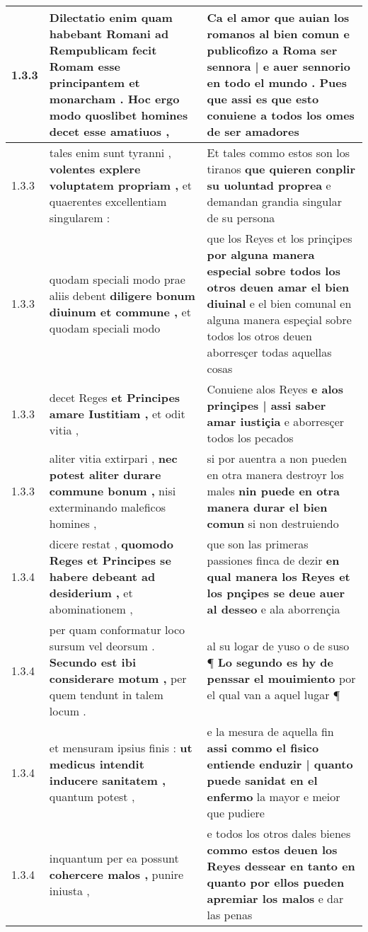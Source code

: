 \begin{tabular}{|p{1cm}|p{6.5cm}|p{6.5cm}|}
1.3.3 & Dilectatio enim quam habebant Romani \textbf{ ad Rempublicam fecit Romam esse principantem et monarcham . } Hoc ergo modo quoslibet homines decet esse amatiuos , & Ca el amor que auian los romanos al bien comun \textbf{ e publicofizo a Roma ser sennora | e auer sennorio en todo el mundo . } Pues que assi es que esto conuiene a todos los omes de ser amadores \\\hline
1.3.3 & tales enim sunt tyranni , \textbf{ volentes explere voluptatem propriam , } et quaerentes excellentiam singularem : & Et tales commo estos son los tiranos \textbf{ que quieren conplir su uoluntad proprea } e demandan grandia singular de su persona \\\hline
1.3.3 & quodam speciali modo prae aliis debent \textbf{ diligere bonum diuinum et commune , } et quodam speciali modo & que los Reyes et los prinçipes \textbf{ por alguna manera especial sobre todos los otros deuen amar el bien diuinal } e el bien comunal en alguna manera espeçial sobre todos los otros deuen aborresçer todas aquellas cosas \\\hline
1.3.3 & decet Reges \textbf{ et Principes amare Iustitiam , } et odit vitia , & Conuiene alos Reyes \textbf{ e alos prinçipes | assi saber amar iustiçia } e aborresçer todos los pecados \\\hline
1.3.3 & aliter vitia extirpari , \textbf{ nec potest aliter durare commune bonum , } nisi exterminando maleficos homines , & si por auentra a non pueden en otra manera destroyr los males \textbf{ nin puede en otra manera durar el bien comun } si non destruiendo \\\hline
1.3.4 & dicere restat , \textbf{ quomodo Reges et Principes se habere debeant ad desiderium , } et abominationem , & que son las primeras passiones finca de dezir \textbf{ en qual manera los Reyes et los pnçipes se deue auer al desseo } e ala aborrençia \\\hline
1.3.4 & per quam conformatur loco sursum vel deorsum . \textbf{ Secundo est ibi considerare motum , } per quem tendunt in talem locum . & al su logar de yuso o de suso ¶ \textbf{ Lo segundo es hy de penssar el mouimiento } por el qual van a aquel lugar ¶ \\\hline
1.3.4 & et mensuram ipsius finis : \textbf{ ut medicus intendit inducere sanitatem , } quantum potest , & e la mesura de aquella fin \textbf{ assi commo el fisico entiende enduzir | quanto puede sanidat en el enfermo } la mayor e meior que pudiere \\\hline
1.3.4 & inquantum per ea possunt \textbf{ cohercere malos , } punire iniusta , & e todos los otros dales bienes \textbf{ commo estos deuen los Reyes dessear en tanto en quanto por ellos pueden apremiar los malos } e dar las penas \\\hline

\end{tabular}
